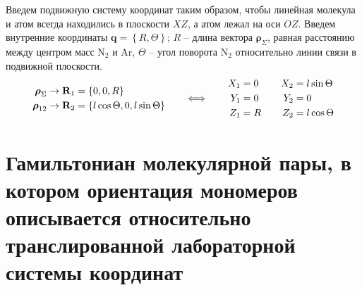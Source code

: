 \documentclass[14pt]{extarticle}
\newcommand{\mf}{\mathbf}
\newcommand{\vrho}{\boldsymbol{\rho}}
\begin{document}
Введем подвижную систему координат таким образом, чтобы линейная молекула и атом всегда находились в плоскости $XZ$, а атом лежал на оси $OZ$. Введем внутренние координаты $\mf{q} = \left\{ R, \Theta \right\}$; $R$ -- длина вектора $\vrho_\Sigma$, равная расстоянию между центром масс N$_2$ и Ar, $\Theta$ -- угол поворота N$_2$ относительно линии связи в подвижной плоскости.  
\begin{gather}
	\begin{aligned}
		\vrho_\Sigma &\rightarrow \mf{R}_1 = \left\{ 0, 0, R \right\} \\ 
		\vrho_{12} &\rightarrow \mf{R}_2 = \left\{ l \cos \Theta, 0, l \sin \Theta \right\}
	\end{aligned} \quad \quad \Longleftrightarrow \quad \quad  
	\begin{aligned}
		X_1 &= 0 \\
		Y_1 &= 0 \\
		Z_1 &= R
	\end{aligned}
	\quad \quad 
	\begin{aligned}
		X_2 &= l \sin \Theta \\
		Y_2 &= 0 \\
		Z_2 &= l \cos \Theta
	\end{aligned} \notag
\end{gather}

\newpage
\section*{Гамильтониан молекулярной пары, в котором ориентация мономеров описывается относительно транслированной лабораторной системы координат}
\end{document}

